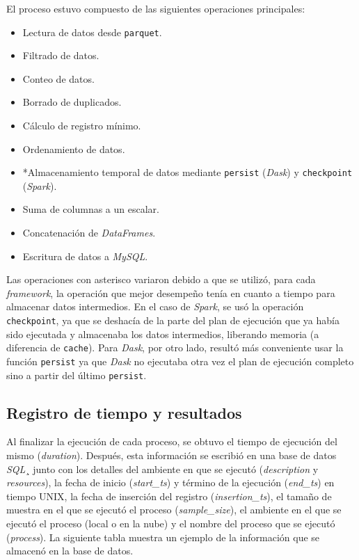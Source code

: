 El proceso estuvo compuesto de las siguientes operaciones principales:

\begin{itemize}
	\item Lectura de datos desde \texttt{parquet}.
	\item Filtrado de datos.
	\item Conteo de datos.
	\item Borrado de duplicados.
	\item Cálculo de registro mínimo.
	\item Ordenamiento de datos.
	\item *Almacenamiento temporal de datos mediante \texttt{persist} (\textit{Dask}) y \texttt{checkpoint} (\textit{Spark}).
	\item Suma de columnas a un escalar.
	\item Concatenación de \textit{DataFrames}.
	\item Escritura de datos a \textit{MySQL}.
\end{itemize}

Las operaciones con asterisco variaron debido a que se utilizó, para cada \textit{framework}, la operación que mejor desempeño tenía en cuanto a tiempo para almacenar datos intermedios. En el caso de \textit{Spark}, se usó la operación \texttt{checkpoint}, ya que se deshacía de la parte del plan de ejecución que ya había sido ejecutada y almacenaba los datos intermedios, liberando memoria (a diferencia de \texttt{cache}). Para \textit{Dask}, por otro lado, resultó más conveniente usar la función \texttt{persist} ya que \textit{Dask} no ejecutaba otra vez el plan de ejecución completo sino a partir del último \texttt{persist}.

\subsection{Registro de tiempo y resultados}

Al finalizar la ejecución de cada proceso, se obtuvo el tiempo de ejecución del mismo (\textit{duration}). Después, esta información se escribió en una base de datos \textit{SQL}¸ junto con los detalles del ambiente en que se ejecutó (\textit{description} y \textit{resources}), la fecha de inicio (\textit{start\_ts}) y término de la ejecución (\textit{end\_ts}) en tiempo UNIX, la fecha de inserción del registro (\textit{insertion\_ts}), el tamaño de muestra en el que se ejecutó el proceso (\textit{sample\_size}), el ambiente en el que se ejecutó el proceso (local o en la nube) y el nombre del proceso que se ejecutó (\textit{process}). La siguiente tabla muestra un ejemplo de la información que se almacenó en la base de datos.

